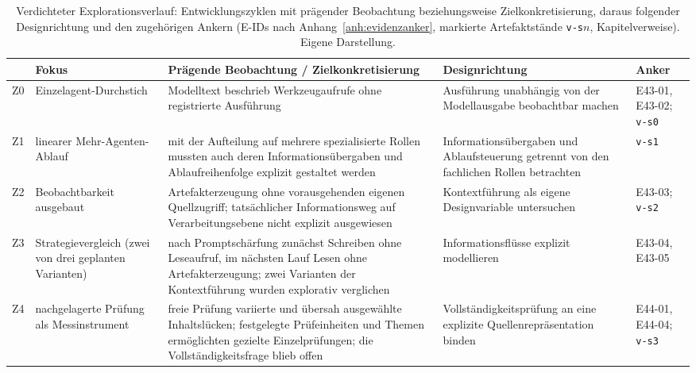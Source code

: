 \begin{table}[tbp]
\centering
\caption[Verdichteter Explorationsverlauf]{Verdichteter
Explorationsverlauf: Entwicklungszyklen mit prägender Beobachtung
beziehungsweise Zielkonkretisierung, daraus folgender Designrichtung und
den zugehörigen Ankern (E-IDs nach Anhang~\ref{anh:evidenzanker},
markierte Artefaktstände \texttt{v-s}$n$, Kapitelverweise). Eigene
Darstellung.}
\label{t:explorationsverlauf-zyklen}
\scriptsize
\setlength{\tabcolsep}{3pt}
\renewcommand{\arraystretch}{1.2}
\begin{tabularx}{\textwidth}{
    >{\raggedright\arraybackslash}p{}
    >{\raggedright\arraybackslash}p{}
    >{\raggedright\arraybackslash}X
    >{\raggedright\arraybackslash}p{}
    >{\raggedright\arraybackslash}p{}
}
\toprule
& \textbf{Fokus} &
\textbf{Prägende Beobachtung / Zielkonkretisierung} &
\textbf{Designrichtung} & \textbf{Anker} \\
\midrule
Z0 & Einzelagent-Durchstich &
Modelltext beschrieb Werkzeugaufrufe ohne registrierte Ausführung &
Ausführung unabhängig von der Modellausgabe beobachtbar machen &
E43-01, E43-02; \texttt{v-s0} \\
\addlinespace[0.3em]
Z1 & linearer Mehr-Agenten-Ablauf &
mit der Aufteilung auf mehrere spezialisierte Rollen mussten auch deren
Informationsübergaben und Ablaufreihenfolge explizit gestaltet werden &
Informationsübergaben und Ablaufsteuerung getrennt von den fachlichen
Rollen betrachten &
\texttt{v-s1} \\
\addlinespace[0.3em]
Z2 & Beobachtbarkeit ausgebaut &
Artefakterzeugung ohne vorausgehenden eigenen Quellzugriff; tatsächlicher
Informationsweg auf Verarbeitungsebene nicht explizit ausgewiesen &
Kontextführung als eigene Designvariable untersuchen &
E43-03; \texttt{v-s2} \\
\addlinespace[0.3em]
Z3 & Strategievergleich (zwei von drei geplanten Varianten) &
nach Promptschärfung zunächst Schreiben ohne Leseaufruf,
im nächsten Lauf Lesen ohne Artefakterzeugung; zwei Varianten
der Kontextführung wurden explorativ verglichen &
Informationsflüsse explizit modellieren &
E43-04, E43-05 \\
\addlinespace[0.3em]
Z4 & nachgelagerte Prüfung als Messinstrument &
freie Prüfung variierte und übersah ausgewählte Inhaltslücken;
festgelegte Prüfeinheiten und Themen ermöglichten gezielte
Einzelprüfungen; die Vollständigkeitsfrage blieb offen &
Vollständigkeitsprüfung an eine explizite Quellenrepräsentation binden &
E44-01, E44-04; \texttt{v-s3} \\

\end{tabularx}
\end{table}
